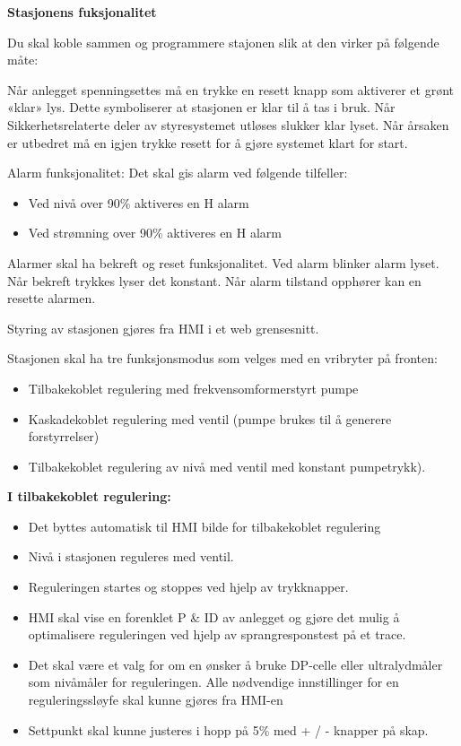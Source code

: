 \textbf{Stasjonens fuksjonalitet}

\vskip 10pt 

Du skal koble sammen og programmere stajonen slik at den virker på følgende måte:

\vskip 5pt 

Når anlegget spenningsettes må en trykke en resett knapp som aktiverer et grønt «klar» lys. Dette symboliserer at stasjonen er klar til å tas i bruk. Når Sikkerhetsrelaterte deler av styresystemet utløses slukker klar lyset. Når årsaken er utbedret må en igjen trykke resett for å gjøre systemet klart for start.  

\vskip 5pt 
Alarm funksjonalitet: 
\vskip 5pt 
Det skal gis alarm ved følgende tilfeller: 
\begin{itemize}[noitemsep]
\item Ved nivå over 90\% aktiveres en H alarm
\item Ved strømning over 90\% aktiveres en H alarm 

\end{itemize}
\vskip 5pt 
Alarmer skal ha bekreft og reset funksjonalitet. Ved alarm blinker alarm lyset. Når bekreft trykkes lyser det konstant. Når alarm tilstand opphører kan en resette alarmen.  

\vskip 5pt 
Styring av stasjonen gjøres fra HMI i et web grensesnitt.

\vskip 5pt 
Stasjonen skal ha tre funksjonsmodus som velges med en vribryter på fronten:
\begin{itemize}[noitemsep]
	\item Tilbakekoblet regulering med frekvensomformerstyrt pumpe
	\item Kaskadekoblet regulering med ventil (pumpe brukes til å generere forstyrrelser)
	\item Tilbakekoblet regulering av nivå med ventil med konstant pumpetrykk). 
\end{itemize}

\vskip 5pt 
\vskip 5pt 
\textbf{I tilbakekoblet regulering:} 
\begin{itemize}[noitemsep]
	\item Det byttes automatisk til HMI bilde for tilbakekoblet regulering 
	\item Nivå i stasjonen reguleres med ventil.  
	\item Reguleringen startes og stoppes ved hjelp av trykknapper.   
	\item HMI skal vise en forenklet P \& ID av anlegget og gjøre det mulig å optimalisere reguleringen ved hjelp av sprangresponstest på et trace.  
	\item Det skal være et valg for om en ønsker å bruke DP-celle eller ultralydmåler som nivåmåler for reguleringen. Alle nødvendige innstillinger for en reguleringssløyfe skal kunne gjøres fra HMI-en 
	\item Settpunkt skal kunne justeres i hopp på 5\% med + / - knapper på skap.  

\end{itemize}


